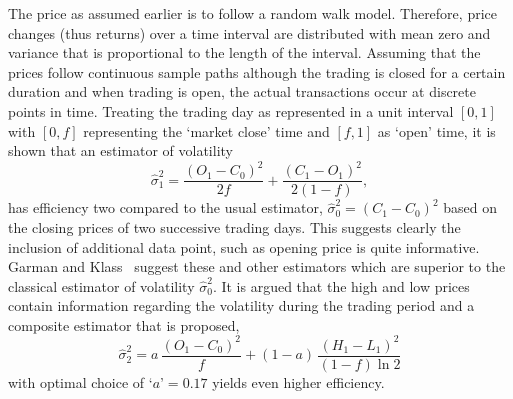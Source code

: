 The price as assumed earlier is to follow a random walk model. Therefore, price changes (thus returns) over a time interval are distributed with mean zero and variance that is proportional to the length of the interval. Assuming that the prices follow continuous sample paths although the trading is closed for a certain duration and when trading is open, the actual transactions occur at discrete points in time. Treating the trading day as represented in a unit interval $[0,1]$ with $[0,f]$ representing the `market close' time and $[f,1]$ as `open' time, it is shown that an estimator of volatility
	\begin{equation}\label{eqn:estvol}
	\hat{\sigma}_1^2= \dfrac{(O_1 - C_0)^2}{2f} + \dfrac{(C_1 - O_1)^2}{2(1-f)},
	\end{equation}
has efficiency two compared to the usual estimator, $\hat{\sigma}^2_0=(C_1 - C_0)^2$ based on the closing prices of two successive trading days. This suggests clearly the inclusion of additional data point, such as opening price is quite informative. Garman and Klass~\cite{klass1980} suggest these and other estimators which are superior to the classical estimator of volatility $\hat{\sigma}^2_0$. It is argued that the high and low prices contain information regarding the volatility during the trading period and a composite estimator that is proposed,
	\begin{equation}\label{eqn:compositeest}
	\hat{\sigma}_2^2= a\,\dfrac{(O_1 - C_0)^2}{f} + (1-a)\, \dfrac{(H_1 - L_1)^2}{(1-f) \ln 2}
	\end{equation}
with optimal choice of `$a$'$=0.17$ yields even higher efficiency.


